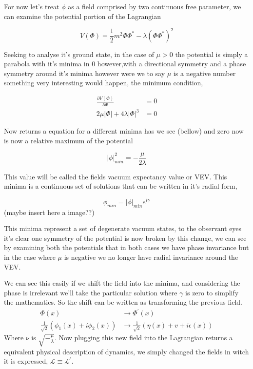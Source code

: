 \documentclass[11pt,twoside,a4paper]{article}
\begin{document}
For now let's treat $\phi$ as a field comprised by two continuous free parameter, we can examine the potential portion of the Lagrangian

\begin{equation}
V(\Phi)=  \frac{1}{2} m^2 \Phi \Phi^* - \lambda (\Phi \Phi^{*})^2
\end{equation}

Seeking to analyse it's ground state, in the case of $\mu > 0$ the potential is simply a parabola with it's minima in 0 however,with a directional symmetry and a phase symmetry around it's minima however were we to say $\mu$ is a negative number something very interesting would happen, the minimum condition,

\begin{align}
\frac{\partial V(\Phi)}{\partial \Phi} & = 0 \\
2  \mu |\Phi|+ 4 \lambda |\Phi|^3 & = 0 
\end{align}

Now returns a equation for a different minima has we see (bellow) and zero now is now a relative maximum of the potential  

\begin{equation}
|\phi|^2_{min} = -\frac{\mu}{2 \lambda}
\end{equation}

This value will be called the fields vacuum expectancy value or VEV. This minima is a continuous set of solutions that can be written in it's radial form, 

\begin{equation}
\phi_{min} = |\phi|_{min}  e^{i\gamma}
\end{equation}
(maybe insert here a image??) 

This minima represent a set of degenerate vacuum states, to the observant eyes it's clear one symmetry of the potential is now broken by this change, we can see by examining both the potentials that in both cases we have phase invariance but in the case where $\mu$ is negative we no longer have radial invariance around the VEV. 

We can see this easily if we shift the field into the minima, and considering the phase is irrelevant we'll take the particular solution where $\gamma$ is zero to simplify the mathematics. So the shift can be written as transforming the previous field. 
\begin{align}
\Phi(x) & \longrightarrow \Phi^\prime (x) \\
\frac{1}{\sqrt{2}} \left( \phi_1 (x) + i \phi_2 (x) \right) & \longrightarrow  \frac{1}{\sqrt{2}} \left( \eta(x) + v + i \epsilon(x) \right) 
\end{align}
Where $\nu$ is $\sqrt{-\frac{\mu}{\lambda}}$. Now plugging this new field into the Lagrangian returns a equivalent physical description of dynamics, we simply changed the fields in witch it is expressed, $\mathcal{L} \equiv \mathcal{L}^\prime$.  
\end{document}
